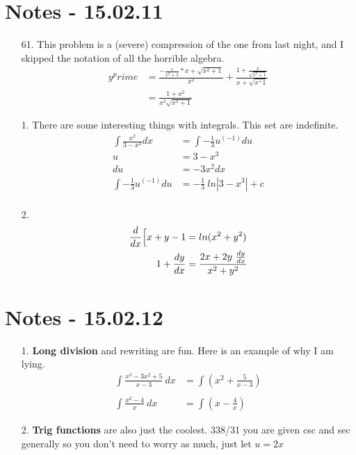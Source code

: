 \documentclass[11pt]{article}
\begin{document}
\section{Notes - 15.02.11}
\begin{itemize}
\item [61. ] This problem is a (severe) compression of the one from last night, and I skipped the notation of all the horrible algebra.
	\begin{align*}
		y^prime &= \frac{-\frac{x}{x^2+1}*x+\sqrt{x^2+1}}{x^2}
		+\frac{1+\frac{x}{\sqrt{x^2+1}}}{x+\sqrt{x^+1}}\\
		&= \frac{1+x^2}{x^2\sqrt{x^2+1}}
	\end{align*}
\item [1. ] There are some interesting things with integrals.  This set are indefinite.
	\begin{align*}
		\int \frac{x^2}{3-x^2}dx &= \int -\frac{1}{3}u^(-1)du\\
		u &= 3-x^3\\ du &= -3x^2dx\\ 
		\int -\frac{1}{3}u^(-1)du &= -\frac{1}{3}\ ln|{3-x^3}|+c\\
	\end{align*}
\item [2. ]
	\begin{align*}
		\frac{d}{dx} \Bigl[x+y-1&=ln(x^2+y^2)\\
		1 + \frac{dy}{dx}&= \frac{2x+2y\ \frac{dy}{dx}}{x^2+y^2} \\
	\end{align*}
\end{itemize}

\section{Notes - 15.02.12}
\begin{itemize}
\item [1. ] {\bf Long division} and rewriting are fun.  Here is an example of why I am lying.
	\begin{align*}
		\int \frac{x^3-3x^2+5}{x-3}\ dx &= \int \left(x^2 + \frac {5}{x-3}\right) \\ \\
		\int \frac{x^2-4}{x}\ dx &= \int \left(x-\frac{4}{x}\right)
	\end{align*}
\item [2. ] {\bf Trig functions} are also just the coolest.  338/31 you are given csc and sec generally so you don't need to worry as much, just let $ u = 2x $
\end{itemize}
\end{document}
